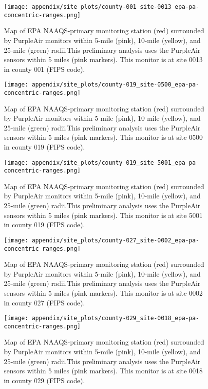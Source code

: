 \begin{figure}[h!]
\centering
\texttt{[image: appendix/site\_plots/county-001\_site-0013\_epa-pa-concentric-ranges.png]}
\caption{Map of EPA NAAQS-primary monitoring station (red) surrounded by PurpleAir monitors within 5-mile (pink), 10-mile (yellow), and 25-mile (green) radii.This preliminary analysis uses the PurpleAir sensors within 5 miles (pink markers). This monitor is at site 0013 in county 001 (FIPS code).}
\label{fig:concentric_purpleair_001-0013}
\end{figure}
\begin{figure}
\centering
\texttt{[image: appendix/site\_plots/county-019\_site-0500\_epa-pa-concentric-ranges.png]}
\caption{Map of EPA NAAQS-primary monitoring station (red) surrounded by PurpleAir monitors within 5-mile (pink), 10-mile (yellow), and 25-mile (green) radii.This preliminary analysis uses the PurpleAir sensors within 5 miles (pink markers). This monitor is at site 0500 in county 019 (FIPS code).}
\label{fig:concentric_purpleair_019-0500}
\end{figure}
\begin{figure}
\centering
\texttt{[image: appendix/site\_plots/county-019\_site-5001\_epa-pa-concentric-ranges.png]}
\caption{Map of EPA NAAQS-primary monitoring station (red) surrounded by PurpleAir monitors within 5-mile (pink), 10-mile (yellow), and 25-mile (green) radii.This preliminary analysis uses the PurpleAir sensors within 5 miles (pink markers). This monitor is at site 5001 in county 019 (FIPS code).}
\label{fig:concentric_purpleair_019-5001}
\end{figure}
\begin{figure}
\centering
\texttt{[image: appendix/site\_plots/county-027\_site-0002\_epa-pa-concentric-ranges.png]}
\caption{Map of EPA NAAQS-primary monitoring station (red) surrounded by PurpleAir monitors within 5-mile (pink), 10-mile (yellow), and 25-mile (green) radii.This preliminary analysis uses the PurpleAir sensors within 5 miles (pink markers). This monitor is at site 0002 in county 027 (FIPS code).}
\label{fig:concentric_purpleair_027-0002}
\end{figure}
\begin{figure}
\centering
\texttt{[image: appendix/site\_plots/county-029\_site-0018\_epa-pa-concentric-ranges.png]}
\caption{Map of EPA NAAQS-primary monitoring station (red) surrounded by PurpleAir monitors within 5-mile (pink), 10-mile (yellow), and 25-mile (green) radii.This preliminary analysis uses the PurpleAir sensors within 5 miles (pink markers). This monitor is at site 0018 in county 029 (FIPS code).}
\label{fig:concentric_purpleair_029-0018}
\end{figure}

